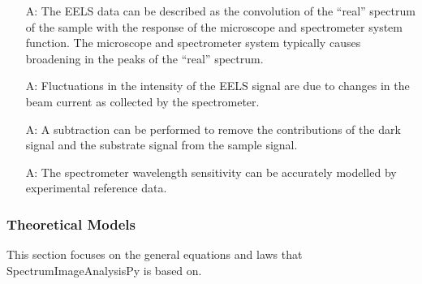 \documentclass[12pt]{article}
\newcounter{assumpnum} %
\newcommand{\progname}{SpectrumImageAnalysisPy} %
\begin{document}
\begin{itemize}

	\item[A\refstepcounter{assumpnum}\theassumpnum \label{EELS System Response}:] The EELS data can be described as the convolution of the ``real'' spectrum of the sample with the response of the microscope and spectrometer system function. The microscope and spectrometer system typically causes broadening in the peaks of the ``real'' spectrum.
	
	\item[A\refstepcounter{assumpnum}\theassumpnum \label{EELS Intensity Fluctuations}:] Fluctuations in the intensity of the EELS signal are due to changes in the beam current as collected by the spectrometer.
	
	\item[A\refstepcounter{assumpnum}\theassumpnum \label{CL Background}:] A subtraction can be performed to remove the contributions of the dark signal and the substrate signal from the sample signal.
	
	\item[A\refstepcounter{assumpnum}\theassumpnum \label{CL System Response}:] The spectrometer wavelength sensitivity can be accurately modelled by experimental reference data.

\end{itemize}

\subsubsection{Theoretical Models}\label{sec_theoretical}

This section focuses on the general equations and laws that \progname{} is based
on.  

~\newline
\end{document}
